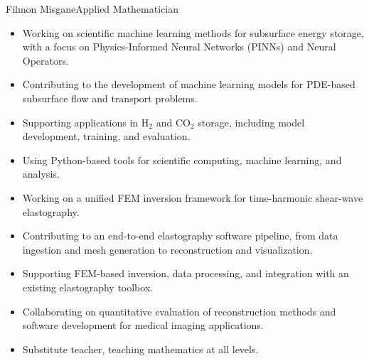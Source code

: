 \documentclass{article}
\begin{document}
\begin{cv}{Filmon Misgane}{Applied Mathematician}
\begin{enumerate}
    \end{enumerate}
    \begin{cvevent}[04.2026][Present]  
        \begin{itemize}
            \item Working on scientific machine learning methods for subsurface energy storage, with a focus on Physics-Informed Neural Networks (PINNs) and Neural Operators.
            \item Contributing to the development of machine learning models for PDE-based subsurface flow and transport problems.
            \item Supporting applications in H$_2$ and CO$_2$ storage, including model development, training, and evaluation.
            \item Using Python-based tools for scientific computing, machine learning, and analysis.
        \end{itemize}
        \hrulefill
    \end{cvevent}
    \begin{cvevent}[04.2026][Present]  
        \begin{itemize}
            \item Working on a unified FEM inversion framework for time-harmonic shear-wave elastography.
            \item Contributing to an end-to-end elastography software pipeline, from data ingestion and mesh generation to reconstruction and visualization.
            \item Supporting FEM-based inversion, data processing, and integration with an existing elastography toolbox.
            \item Collaborating on quantitative evaluation of reconstruction methods and software development for medical imaging applications.
        \end{itemize}
        \hrulefill
    \end{cvevent}
    \begin{cvevent}[01.2025][Present]  
        \begin{itemize}
            \item Substitute teacher, teaching mathematics at all levels.
        \end{itemize}
        \hrulefill
    \end{cvevent}


\end{cv}
\end{document}
